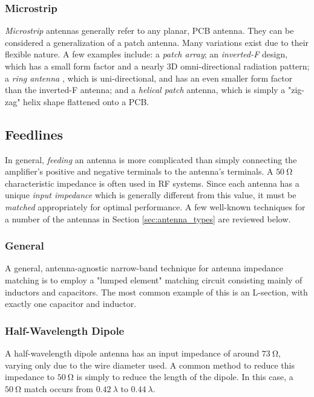\subsubsection{Microstrip}
\textit{Microstrip} antennas generally refer to any planar, PCB antenna. They can be considered a generalization of a patch antenna. Many variations exist due to their flexible nature. A few examples include: a \textit{patch array}; an \textit{inverted-F} design, which has a small form factor and a nearly 3D omni-directional radiation pattern; a \textit{ring antenna} \cite{paper-lowProfileRingAntenna}, which is uni-directional, and has an even smaller form factor than the inverted-F antenna; and a \textit{helical patch} antenna, which is simply a "zig-zag" helix shape flattened onto a PCB.

\subsection{Feedlines}
In general, \textit{feeding} an antenna is more complicated than simply connecting the amplifier's positive and negative terminals to the antenna's terminals. A $\SI{50}{\ohm}$ characteristic impedance is often used in RF systems. Since each antenna has a unique \textit{input impedance} which is generally different from this value, it must be \textit{matched} appropriately for optimal performance. A few well-known techniques for a number of the antennas in Section \ref{sec:antenna_types} are reviewed below.

\subsubsection{General}
A general, antenna-agnostic narrow-band technique for antenna impedance matching is to employ a "lumped element" matching circuit consisting mainly of inductors and capacitors. The most common example of this is an L-section, with exactly one capacitor and inductor.

\subsubsection{Half-Wavelength Dipole}
A half-wavelength dipole antenna has an input impedance of around $\SI{73}{\ohm}$, varying only due to the wire diameter used. A common method to reduce this impedance to $\SI{50}{\ohm}$ is simply to reduce the length of the dipole. In this case, a $\SI{50}{\ohm}$ match occurs from $\SI{0.42}{\lambda}$ to $\SI{0.44}{\lambda}$. \cite{textbook-antennaTheoryAnalysisDesign}

